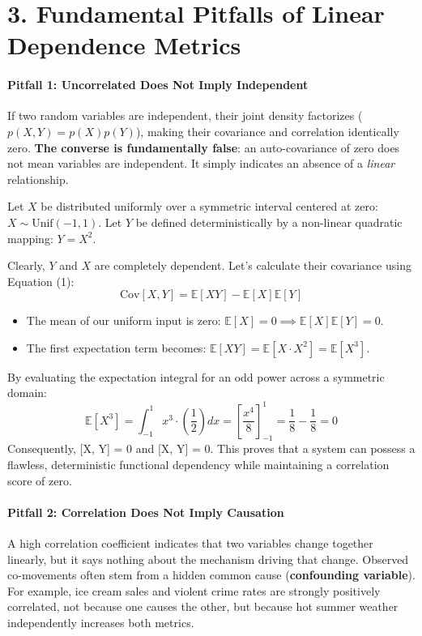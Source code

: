 \documentclass{article}
\begin{document}
\section*{3. Fundamental Pitfalls of Linear Dependence Metrics}

\paragraph{Pitfall 1: Uncorrelated Does Not Imply Independent}
If two random variables are independent, their joint density factorizes ($p(X,Y) = p(X)p(Y)$), making their covariance and correlation identically zero. \textbf{The converse is fundamentally false}: an auto-covariance of zero does not mean variables are independent. It simply indicates an absence of a \textit{linear} relationship.

\begin{tcolorbox}[colback=red!5!white, colframe=red!60!black, title=Analytical Counterexample Proof]
Let $X$ be distributed uniformly over a symmetric interval centered at zero: $X \sim \text{Unif}(-1, 1)$. Let $Y$ be defined deterministically by a non-linear quadratic mapping: $Y = X^2$. 

Clearly, $Y$ and $X$ are completely dependent. Let's calculate their covariance using Equation (1):
\begin{equation*}
\text{Cov}[X, Y] = \mathbb{E}[XY] - \mathbb{E}[X]\mathbb{E}[Y]
\end{equation*}
\begin{itemize}
    \item The mean of our uniform input is zero: $\mathbb{E}[X] = 0 \implies \mathbb{E}[X]\mathbb{E}[Y] = 0$.
    \item The first expectation term becomes: $\mathbb{E}[XY] = \mathbb{E}[X \cdot X^2] = \mathbb{E}[X^3]$.
\end{itemize}
By evaluating the expectation integral for an odd power across a symmetric domain:
\begin{equation*}
\mathbb{E}[X^3] = \int_{-1}^{1} x^3 \cdot \left(\frac{1}{2}\right) dx = \left[ \frac{x^4}{8} \right]_{-1}^{1} = \frac{1}{8} - \frac{1}{8} = 0
\end{equation*}
Consequently, [X, Y] = 0 and [X, Y] = 0. This proves that a system can possess a flawless, deterministic functional dependency while maintaining a correlation score of zero.
\end{tcolorbox}

\paragraph{Pitfall 2: Correlation Does Not Imply Causation}
A high correlation coefficient indicates that two variables change together linearly, but it says nothing about the mechanism driving that change. Observed co-movements often stem from a hidden common cause (\textbf{confounding variable}). For example, ice cream sales and violent crime rates are strongly positively correlated, not because one causes the other, but because hot summer weather independently increases both metrics.
\end{document}
